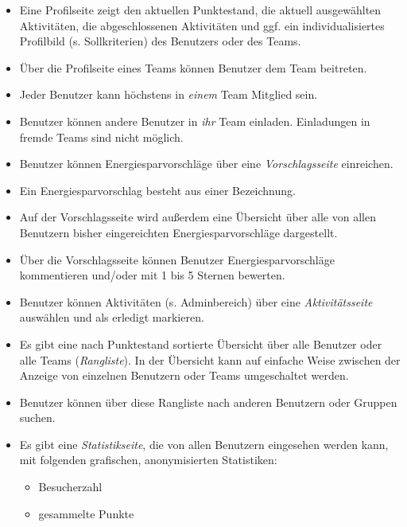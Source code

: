 \documentclass[10pt,a4paper]{article}
\begin{document}
\begin{itemize}
\begin{itemize}
                        \item Eine Profilseite zeigt den aktuellen Punktestand, die aktuell ausgewählten Aktivitäten, die abgeschlossenen Aktivitäten und ggf. ein individualisiertes Profilbild (s. Sollkriterien) des Benutzers oder des Teams.
                        \item Über die Profilseite eines Teams können Benutzer dem Team beitreten.
                        \item Jeder Benutzer kann höchstens in \emph{einem} Team Mitglied sein.
                        \item Benutzer können andere Benutzer in \emph{ihr} Team einladen. Einladungen in fremde Teams sind nicht möglich.
			\item Benutzer können Energiesparvorschläge über eine \emph{Vorschlagsseite} einreichen.
                        \item Ein Energiesparvorschlag besteht aus einer Bezeichnung.
                        \item Auf der Vorschlagsseite wird außerdem eine Übersicht über alle von allen Benutzern bisher eingereichten Energiesparvorschläge dargestellt.
                        \item Über die Vorschlagsseite können Benutzer Energiesparvorschläge kommentieren und/oder mit 1 bis 5 Sternen bewerten.
			\item Benutzer können Aktivitäten (s. Adminbereich) über eine \emph{Aktivitätsseite} auswählen und als erledigt markieren.
			\item Es gibt eine nach Punktestand sortierte Übersicht über alle Benutzer oder alle Teams (\emph{Rangliste}). In der Übersicht kann auf einfache Weise zwischen der Anzeige von einzelnen Benutzern oder Teams umgeschaltet werden.
                        \item Benutzer können über diese Rangliste nach anderen Benutzern oder Gruppen suchen.
			\item Es gibt eine \emph{Statistikseite}, die von allen Benutzern eingesehen werden kann, mit folgenden grafischen, anonymisierten Statistiken:
			\begin{itemize}
				\item Besucherzahl
				\item gesammelte Punkte

\end{itemize}
\end{itemize}
\end{itemize}
\end{document}
